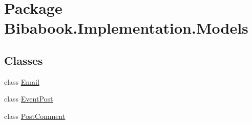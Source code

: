 \hypertarget{namespace_bibabook_1_1_implementation_1_1_models}{}\section{Package Bibabook.\+Implementation.\+Models}
\label{namespace_bibabook_1_1_implementation_1_1_models}
\subsection*{Classes}
\begin{DoxyCompactItemize}
\item 
class \hyperlink{class_bibabook_1_1_implementation_1_1_models_1_1_email}{Email}
\item 
class \hyperlink{class_bibabook_1_1_implementation_1_1_models_1_1_event_post}{Event\+Post}
\item 
class \hyperlink{class_bibabook_1_1_implementation_1_1_models_1_1_post_comment}{Post\+Comment}
\end{DoxyCompactItemize}
